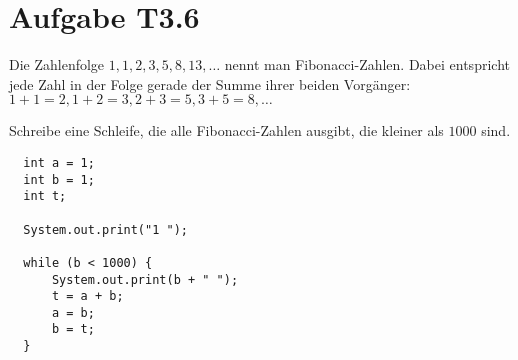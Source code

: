 \documentclass[final,a4paper]{article}
\begin{document}
\section*{Aufgabe T3.6}
	Die Zahlenfolge $1, 1, 2, 3, 5, 8, 13, \ldots$ nennt man Fibonacci-Zahlen. Dabei entspricht jede Zahl
	in der Folge gerade der Summe ihrer beiden Vorgänger: $1+1=2, 1+2=3, 2+3=5, 3+5=8, \ldots$

	Schreibe eine Schleife, die alle Fibonacci-Zahlen ausgibt, die kleiner als $1000$ sind.

	\begin{lstlisting}
  int a = 1;
  int b = 1;
  int t;

  System.out.print("1 ");

  while (b < 1000) {
	  System.out.print(b + " ");
	  t = a + b;
	  a = b;
	  b = t;
  }
	\end{lstlisting}
\end{document}
